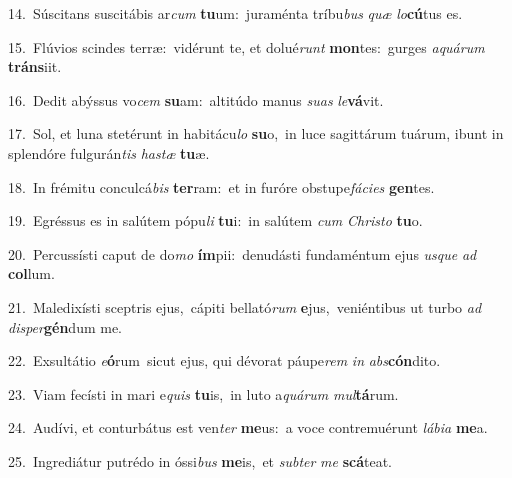 {\numbfont\textcolor{\numbcolor}{14.}}~Súscitans suscitábis ar\textit{cum} \textbf{tu}\-um:~\star juraménta tríbu\textit{bus} \textit{quæ} \textit{lo}\-\textbf{cú}tus es.\par
{\numbfont\textcolor{\numbcolor}{15.}}~Flúvios scindes terræ:~\dagger vidérunt te, et dolué\textit{runt} \textbf{mon}\-tes:~\star gurges \textit{a}\-\textit{quá}\textit{rum} \textbf{tráns}\-iit.\par
{\numbfont\textcolor{\numbcolor}{16.}}~Dedit abýssus vo\textit{cem} \textbf{su}\-am:~\star altitúdo manus \textit{su}\-\textit{as} \textit{le}\-\textbf{vá}vit.\par
{\numbfont\textcolor{\numbcolor}{17.}}~Sol, et luna stetérunt in habitácu\textit{lo} \textbf{su}\-o,~\star in luce sagittárum tuárum, ibunt in splendóre fulgurán\textit{tis} \textit{has}\-\textit{tæ} \textbf{tu}\-æ.\par
{\numbfont\textcolor{\numbcolor}{18.}}~In frémitu conculcá\textit{bis} \textbf{ter}\-ram:~\star et in furóre obstupe\-\textit{fá}\-\textit{ci}\textit{es} \textbf{gen}\-tes.\par
{\numbfont\textcolor{\numbcolor}{19.}}~Egréssus es in salútem pópu\textit{li} \textbf{tu}\-i:~\star in salútem \textit{cum} \textit{Chris}\-\textit{to} \textbf{tu}\-o.\par
{\numbfont\textcolor{\numbcolor}{20.}}~Percussísti caput de do\textit{mo} \textbf{ím}\-pii:~\star denudásti fundaméntum ejus \textit{us}\-\textit{que} \textit{ad} \textbf{col}\-lum.\par
{\numbfont\textcolor{\numbcolor}{21.}}~Maledixísti sceptris ejus,~\dagger cápiti bellató\textit{rum} \textbf{e}\-jus,~\star veniéntibus ut turbo \textit{ad} \textit{di}\-\textit{sper}\textbf{gén}dum me.\par
{\numbfont\textcolor{\numbcolor}{22.}}~Exsultátio \textit{e}\-\textbf{ó}rum~\star sicut ejus, qui dévorat páupe\textit{rem} \textit{in} \textit{abs}\-\textbf{cón}dito.\par
{\numbfont\textcolor{\numbcolor}{23.}}~Viam fecísti in mari e\textit{quis} \textbf{tu}\-is,~\star in luto a\-\textit{quá}\-\textit{rum} \textit{mul}\-\textbf{tá}rum.\par
{\numbfont\textcolor{\numbcolor}{24.}}~Audívi, et conturbátus est ven\textit{ter} \textbf{me}\-us:~\star a voce contremuérunt \textit{lá}\-\textit{bi}\textit{a} \textbf{me}\-a.\par
{\numbfont\textcolor{\numbcolor}{25.}}~Ingrediátur putrédo in óssi\textit{bus} \textbf{me}\-is,~\star et \textit{sub}\-\textit{ter} \textit{me} \textbf{scá}\-teat.\par
